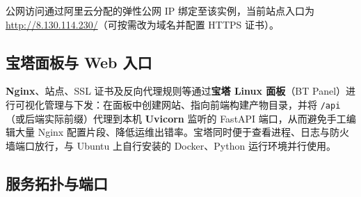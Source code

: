 \documentclass[12pt,a4paper]{ctexart}
\begin{document}
公网访问通过阿里云分配的弹性公网 IP 绑定至该实例，当前站点入口为 \url{http://8.130.114.230/}（可按需改为域名并配置 HTTPS 证书）。

\subsection{宝塔面板与 Web 入口}

\textbf{Nginx}、站点、SSL 证书及反向代理规则等通过\textbf{宝塔 Linux 面板}（BT Panel）进行可视化管理与下发：在面板中创建网站、指向前端构建产物目录，并将 \texttt{/api}（或后端实际前缀）代理到本机 \textbf{Uvicorn} 监听的 FastAPI 端口，从而避免手工编辑大量 Nginx 配置片段、降低运维出错率。宝塔同时便于查看进程、日志与防火墙端口放行，与 Ubuntu 上自行安装的 Docker、Python 运行环境并行使用。

\subsection{服务拓扑与端口}
\end{document}
